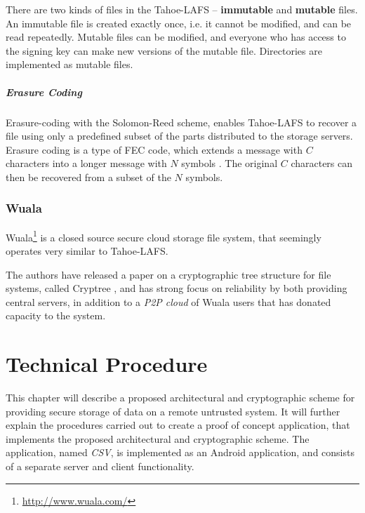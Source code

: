 \documentclass[pdftex,english,10pt,b5paper,twoside]{book}
\begin{document}
There are two kinds of files in the Tahoe-\ac{LAFS} -- \textbf{immutable} and
\textbf{mutable} files. An immutable file is created exactly once, i.e. it
cannot be modified, and can be read repeatedly. Mutable files can be modified,
and everyone who has access to the signing key can make new versions of
the mutable file. Directories are implemented as mutable files.

\paragraph{Erasure Coding}

Erasure-coding with the Solomon-Reed scheme, enables Tahoe-\ac{LAFS} to recover
a file using only a predefined subset of the parts distributed to the storage
servers. Erasure coding is a type of \ac{FEC} code, which extends a message
with $C$ characters into a longer message with $N$ symbols
\cite{t_reed-solomon}. The original $C$ characters can then be recovered from a
subset of the $N$ symbols.

\subsection{Wuala}

Wuala\footnote{\url{http://www.wuala.com/}} is a closed source secure cloud
storage file system, that seemingly operates very similar to Tahoe-\ac{LAFS}.

The authors have released a paper on a cryptographic tree structure for file
systems, called Cryptree \cite{cryptree}, and has strong focus on reliability
by both providing central servers, in addition to a \emph{P2P cloud} of Wuala
users that has donated capacity to the system.

\chapter{Technical Procedure}
\label{ch:technical}


This chapter will describe a proposed architectural and cryptographic scheme
for providing secure storage of data on a remote untrusted system. It will
further explain the procedures carried out to create a proof of concept
application, that implements the proposed architectural and cryptographic
scheme. The application, named \emph{\ac{CSV}}, is implemented as an
Android application, and consists of a separate server and client functionality.
\end{document}
